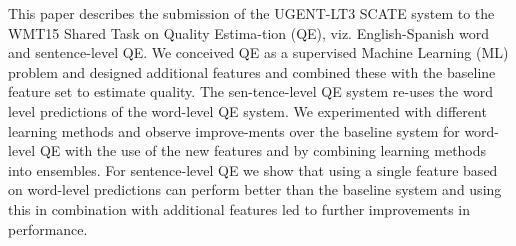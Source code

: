 This paper describes the submission of the UGENT-LT3 SCATE system to the WMT15 Shared Task on Quality Estima-tion (QE), viz. English-Spanish word and sentence-level QE. We conceived QE as a supervised Machine Learning (ML) problem and designed additional features and combined these with the baseline feature set to estimate quality. The sen-tence-level QE system re-uses the word level predictions of the word-level QE system. We experimented with different learning methods and observe improve-ments over the baseline system for word-level QE with the use of the new features and by combining learning methods into ensembles. For sentence-level QE we show that using a single feature based on word-level predictions can perform better than the baseline system and using this in combination with additional features led to further improvements in performance.
